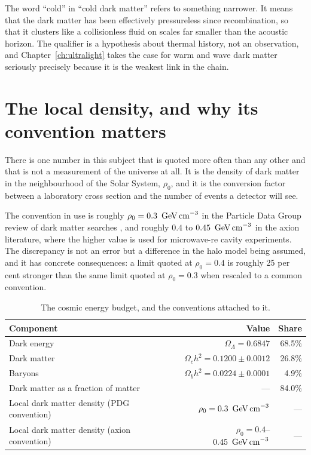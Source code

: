 The word ``cold'' in ``cold dark matter'' refers to something narrower. It
means that the dark matter has been effectively pressureless since
recombination, so that it clusters like a collisionless fluid on scales far
smaller than the acoustic horizon. The qualifier is a hypothesis about
thermal history, not an observation, and Chapter~\ref{ch:ultralight} takes the
case for warm and wave dark matter seriously precisely because it is the
weakest link in the chain.

\section{The local density, and why its convention matters}There is one number in this subject that is quoted
more often than any other and that is not a measurement of the universe at
all. It is the density of dark matter in the neighbourhood of the Solar
System, $\rho_0$, and it is the conversion factor between a laboratory
cross section and the number of events a detector will see.

The convention in use is roughly $\rho_0 = 0.3\ \GeVcmthree$ in the Particle
Data Group review of dark matter searches , and
roughly $0.4$ to $0.45\ \,\mathrm{GeV\,cm}^{-3}$ in the axion literature, where the
higher value is used for microwave-re cavity experiments. The discrepancy is
not an error but a difference in the halo model being assumed, and it has
concrete consequences: a limit quoted at $\rho_0 = 0.4$ is roughly 25 per
cent stronger than the same limit quoted at $\rho_0 = 0.3$ when rescaled to a
common convention.

\begin{table}[H]
\centering
\caption{The cosmic energy budget, and the conventions attached to it.}
\label{tab:budget}
\begin{tabular}{@{}>{\RaggedRight\arraybackslash}p{}r r@{}}
\toprule
\textbf{Component} & \textbf{Value} & \textbf{Share} \\
\midrule
Dark energy & $\Omega_\Lambda = 0.6847$ & 68.5\% \\
Dark matter & $\Omega_c h^2 = 0.1200 \pm 0.0012$ & 26.8\% \\
Baryons & $\Omega_b h^2 = 0.0224 \pm 0.0001$ & 4.9\% \\
\midrule
Dark matter as a fraction of matter & --- & 84.0\% \\
Local dark matter density (PDG convention) & $\rho_0 = 0.3\ \GeVcmthree$ & --- \\
Local dark matter density (axion convention) & $\rho_0 = 0.4$--$0.45\ \,\mathrm{GeV\,cm}^{-3}$ & --- \\
\bottomrule
\end{tabular}
\end{table}

